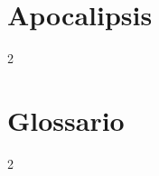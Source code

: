 \chapter{Apocalipsis}
\begin{multicols}{2}
  \raggedcolumns
  \parskip=0pt \relax
  
\end{multicols}

\chapter{Glossario}
\begin{multicols}{2}
  \raggedcolumns
  \parskip=0pt \relax
  
\end{multicols}

\newpage





















